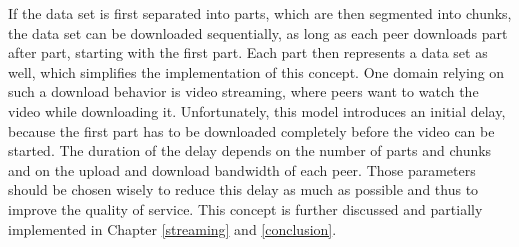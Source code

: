 If the data set is first separated into parts, which are then segmented into chunks, the data set can be downloaded sequentially, as long as each peer downloads part after part, starting with the first part. Each part then represents a data set as well, which simplifies the implementation of this concept. One domain relying on such a download behavior is video streaming, where peers want to watch the video while downloading it. Unfortunately, this model introduces an initial delay, because the first part has to be downloaded completely before the video can be started. The duration of the delay depends on the number of parts and chunks and on the upload and download bandwidth of each peer. Those parameters should be chosen wisely to reduce this delay as much as possible and thus to improve the quality of service. This concept is further discussed and partially implemented in Chapter \ref{streaming} and \ref{conclusion}.

